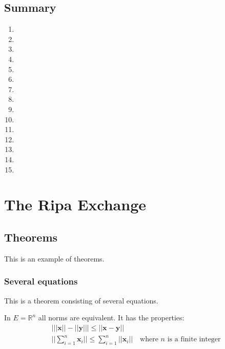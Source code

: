 \documentclass[11pt,fleqn,oneside]{book} %
\begin{document}
\section{Summary}
\begin{enumerate}
	\item \lipsum[1]
	\item \lipsum[2]
	\item \lipsum[3]
	\item \lipsum[4]
	\item \lipsum[5]
	\item \lipsum[6]
	\item \lipsum[7]
	\item \lipsum[8]
	\item \lipsum[9]
	\item \lipsum[10]
	\item \lipsum[11]
	\item \lipsum[12]
	\item \lipsum[13]
	\item \lipsum[14]
	\item \lipsum[15]
\end{enumerate}




\chapter{The Ripa Exchange}

\section{Theorems}

This is an example of theorems.

\subsection{Several equations}
This is a theorem consisting of several equations.

\begin{theorem}
	In $E=\mathbb{R}^n$ all norms are equivalent. It has the properties:
	\begin{align}
		 & \big| ||\mathbf{x}|| - ||\mathbf{y}|| \big|\leq || \mathbf{x}- \mathbf{y}||                            \\
		 & ||\sum_{i=1}^n\mathbf{x}_i||\leq \sum_{i=1}^n||\mathbf{x}_i||\quad\text{where $n$ is a finite integer}
	\end{align}
\end{theorem}
\end{document}
